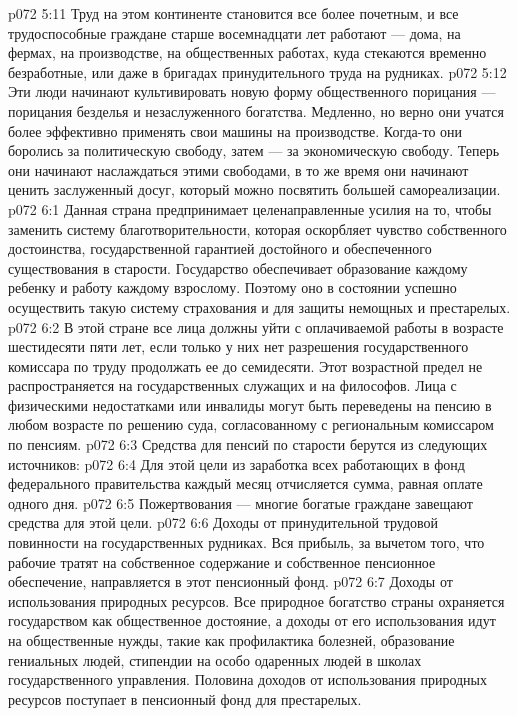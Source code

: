 \vs p072 5:11 Труд на этом континенте становится все более почетным, и все трудоспособные граждане старше восемнадцати лет работают --- дома, на фермах, на производстве, на общественных работах, куда стекаются временно безработные, или даже в бригадах принудительного труда на рудниках.
\vs p072 5:12 Эти люди начинают культивировать новую форму общественного порицания --- порицания безделья и незаслуженного богатства. Медленно, но верно они учатся более эффективно применять свои машины на производстве. Когда\hyp{}то они боролись за политическую свободу, затем --- за экономическую свободу. Теперь они начинают наслаждаться этими свободами, в то же время они начинают ценить заслуженный досуг, который можно посвятить большей самореализации.
\vs p072 6:1 Данная страна предпринимает целенаправленные усилия на то, чтобы заменить систему благотворительности, которая оскорбляет чувство собственного достоинства, государственной гарантией достойного и обеспеченного существования в старости. Государство обеспечивает образование каждому ребенку и работу каждому взрослому. Поэтому оно в состоянии успешно осуществить такую систему страхования и для защиты немощных и престарелых.
\vs p072 6:2 В этой стране все лица должны уйти с оплачиваемой работы в возрасте шестидесяти пяти лет, если только у них нет разрешения государственного комиссара по труду продолжать ее до семидесяти. Этот возрастной предел не распространяется на государственных служащих и на философов. Лица с физическими недостатками или инвалиды могут быть переведены на пенсию в любом возрасте по решению суда, согласованному с региональным комиссаром по пенсиям.
\vs p072 6:3 \pc Средства для пенсий по старости берутся из следующих источников:
\vs p072 6:4 \bibnobreakspace Для этой цели из заработка всех работающих в фонд федерального правительства каждый месяц отчисляется сумма, равная оплате одного дня.
\vs p072 6:5 \bibnobreakspace Пожертвования --- многие богатые граждане завещают средства для этой цели.
\vs p072 6:6 \bibnobreakspace Доходы от принудительной трудовой повинности на государственных рудниках. Вся прибыль, за вычетом того, что рабочие тратят на собственное содержание и собственное пенсионное обеспечение, направляется в этот пенсионный фонд.
\vs p072 6:7 \bibnobreakspace Доходы от использования природных ресурсов. Все природное богатство страны охраняется государством как общественное достояние, а доходы от его использования идут на общественные нужды, такие как профилактика болезней, образование гениальных людей, стипендии на особо одаренных людей в школах государственного управления. Половина доходов от использования природных ресурсов поступает в пенсионный фонд для престарелых.
